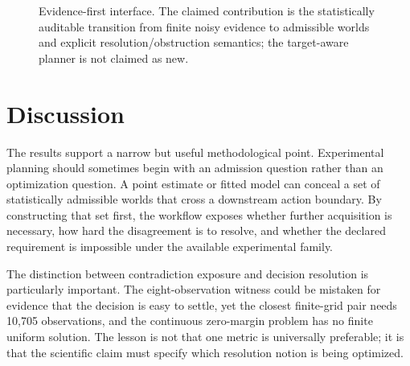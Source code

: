 \documentclass[11pt]{article}
\newcommand{\CalC}{\mathcal{C}}
\begin{document}
\begin{figure}[H]
\centering
{}
\caption{Evidence-first interface. The claimed contribution is the statistically auditable transition from finite noisy evidence to admissible worlds and explicit resolution/obstruction semantics; the target-aware planner is not claimed as new.}
\label{fig:pipeline}
\end{figure}

\section{Discussion}
The results support a narrow but useful methodological point. Experimental planning should sometimes begin with an admission question rather than an optimization question. A point estimate or fitted model can conceal a set of statistically admissible worlds that cross a downstream action boundary. By constructing that set first, the workflow exposes whether further acquisition is necessary, how hard the disagreement is to resolve, and whether the declared requirement is impossible under the available experimental family.

The distinction between contradiction exposure and decision resolution is particularly important. The eight-observation witness could be mistaken for evidence that the decision is easy to settle, yet the closest finite-grid pair needs 10,705 observations, and the continuous zero-margin problem has no finite uniform solution. The lesson is not that one metric is universally preferable; it is that the scientific claim must specify which resolution notion is being optimized.
\end{document}

